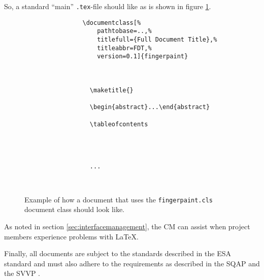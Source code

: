 So, a standard ``main'' \texttt{.tex}-file should like as is shown in figure \ref{fig:exampledocument}.

\begin{figure}
	\begin{center}
		\begin{minipage}{0.8\textwidth}
			\begin{verbatim}
				\documentclass[%
				    pathtobase=..,%
				    titlefull={Full Document Title},%
				    titleabbr=FDT,%
				    version=0.1]{fingerpaint}

				

				  \maketitle{}

				  \begin{abstract}...\end{abstract}

				  \tableofcontents

				  
				  
				  
				  ...

				
			\end{verbatim}
			\caption{Example of how a document that uses the \texttt{fingerpaint.cls} document class should look like.}
			\label{fig:exampledocument}
		\end{minipage}
	\end{center}
\end{figure}

As noted in section \ref{sec:interfacemanagement}, the CM can assist when project members experience problems with \LaTeX{}.

Finally, all documents are subject to the standards described in the ESA standard \cite{esa} and must also adhere to the requirements as described in the SQAP \cite{sqap} and the SVVP \cite{svvp}.